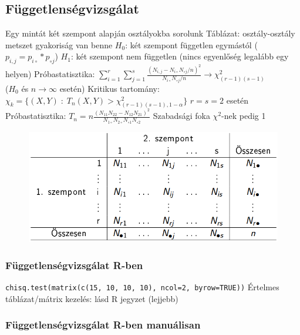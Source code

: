 \documentclass[12pt,a4paper]{article}
\begin{document}
\pagebreak

\subsection{Függetlenségvizsgálat}

\begin{outline}
	\1 Egy mintát két szempont alapján osztályokba sorolunk
		\2 Táblázat: osztály-osztály metszet gyakoriság van benne
	\1 $H_0$: két szempont független egymástól ($p_{i,j} = p_{i \circ} * p_{\circ j}$)
	\1 $H_1$: két szempont nem független (nincs egyenlőség legalább egy helyen)
	\1 Próbastatisztika: $\sum_{i=1}^{r} \sum_{j=1}^{s}
	\frac{(N_{i,j} - N_{i \circ} N_{\circ j} / n)^2} { N_{i \circ} N_{\circ j} / n }
	\to \chi^2_{(r-1)(s-1)}$\\
	($H_0$ és $n \to \infty$ esetén)
	\1 Kritikus tartomány: $\chi_k = \{ (X,Y) \;:\; T_n(X,Y) > \chi^2_{(r-1)(s-1),1-\alpha} \}$
	\1 $r=s=2$ esetén
		\2 Próbastatisztika: $T_n = n \frac{(N_{11}N_{22} - N_{12}N_{21})^2}
		{N_{1\circ} N_{2\circ} N_{\circ 1} N_{\circ 2}}$
		\2 Szabadsági foka $\chi^2$-nek pedig 1
\end{outline}

\begin{figure}[h!]
	\centering
	\includegraphics[width=0.7\linewidth]{függetlenségvizsgálat}
\end{figure}

\subsubsection{Függetlenségvizsgálat R-ben}

\begin{outline}
	\1 \texttt{chisq.test(matrix(c(15, 10, 10, 10), ncol=2, byrow=TRUE))}
		\2 Értelmes táblázat/mátrix kezelés: lásd R jegyzet (lejjebb)
\end{outline}

\pagebreak

\subsubsection{Függetlenségvizsgálat R-ben manuálisan}
\end{document}
